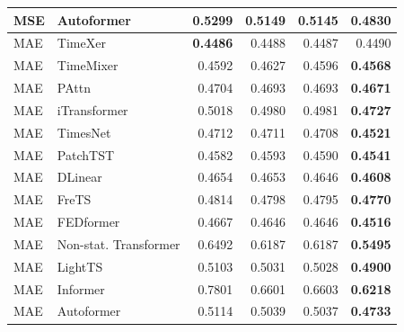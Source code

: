 \begin{longtable}{llrrrr}
MSE & Autoformer & 0.5299 & 0.5149 & 0.5145 & \textbf{0.4830} \\
\midrule
MAE & TimeXer & \textbf{0.4486} & 0.4488 & 0.4487 & 0.4490 \\
MAE & TimeMixer & 0.4592 & 0.4627 & 0.4596 & \textbf{0.4568} \\
MAE & PAttn & 0.4704 & 0.4693 & 0.4693 & \textbf{0.4671} \\
MAE & iTransformer & 0.5018 & 0.4980 & 0.4981 & \textbf{0.4727} \\
MAE & TimesNet & 0.4712 & 0.4711 & 0.4708 & \textbf{0.4521} \\
MAE & PatchTST & 0.4582 & 0.4593 & 0.4590 & \textbf{0.4541} \\
MAE & DLinear & 0.4654 & 0.4653 & 0.4646 & \textbf{0.4608} \\
MAE & FreTS & 0.4814 & 0.4798 & 0.4795 & \textbf{0.4770} \\
MAE & FEDformer & 0.4667 & 0.4646 & 0.4646 & \textbf{0.4516} \\
MAE & Non-stat. Transformer & 0.6492 & 0.6187 & 0.6187 & \textbf{0.5495} \\
MAE & LightTS & 0.5103 & 0.5031 & 0.5028 & \textbf{0.4900} \\
MAE & Informer & 0.7801 & 0.6601 & 0.6603 & \textbf{0.6218} \\
MAE & Autoformer & 0.5114 & 0.5039 & 0.5037 & \textbf{0.4733} \\
\end{longtable}
\endgroup

